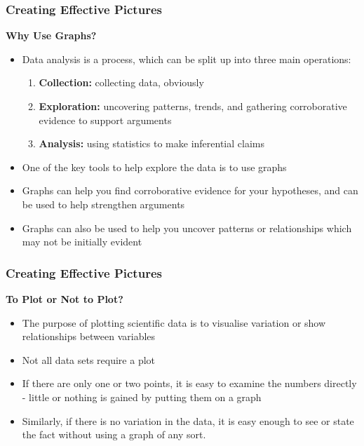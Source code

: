 \documentclass{beamer}
\begin{document}
\begin{frame}
\frametitle{Creating Effective Pictures}
\textbf{Why Use Graphs?}
\vspace{0.5cm}
\begin{itemize}
\item Data analysis is a process, which can be split up into three main operations:
\begin{enumerate}
\item \textbf{Collection:} collecting data, obviously
\item \textbf{Exploration:} uncovering patterns, trends, and gathering corroborative evidence to support arguments
\item \textbf{Analysis:} using statistics to make inferential claims
\end{enumerate}
\vspace{0.5cm}
\item One of the key tools to help explore the data is to use graphs
\vspace{0.5cm}
\item Graphs can help you find corroborative evidence for your hypotheses, and can be used to help strengthen arguments
\vspace{0.5cm}
\item Graphs can also be used to help you uncover patterns or relationships which may not be initially evident
\end{itemize}
\end{frame}


\begin{frame}
\frametitle{Creating Effective Pictures}
\textbf{To Plot or Not to Plot?}\\
\vspace{0.2cm}
\begin{itemize}
\item The purpose of plotting scientific data is to visualise variation or show relationships between variables
\vspace{0.5cm}
\item Not all data sets require a plot
\vspace{0.5cm}
\item If there are only one or two points, it is easy to examine the numbers directly - little or nothing is gained by putting them on a graph
\vspace{0.5cm}
\item Similarly, if there is no variation in the data, it is easy enough to see or state the fact without using a graph of any sort.
\end{itemize}
\end{frame}
\end{document}

